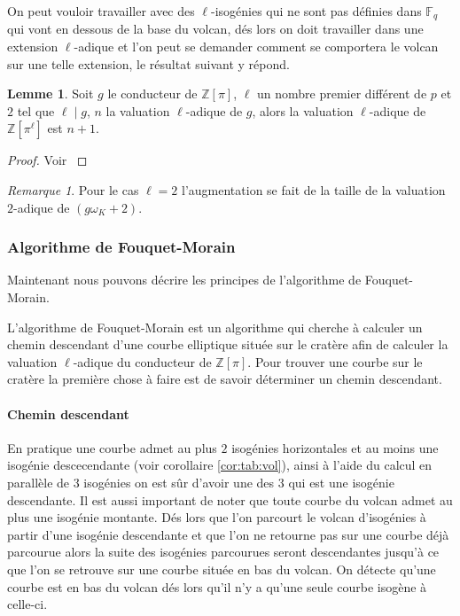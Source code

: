 \documentclass[10pt,a4paper]{book}
\theoremstyle{plain}
\theoremstyle{definition}
\newtheorem{lem}[thm]{Lemme}
\theoremstyle{definition}
\theoremstyle{definition}
\theoremstyle{definition}
\theoremstyle{remark}
\newtheorem{rem}[thm]{Remarque}
\theoremstyle{remark}
\begin{document}
On peut vouloir travailler avec des $\ell$-isogénies qui ne sont pas définies dans $\mathbb{F}_q$ qui vont en dessous de la base du volcan, dés lors on doit travailler dans une extension $\ell$-adique et l'on peut se demander comment se comportera le volcan sur une telle extension, le résultat suivant y répond.

\begin{lem}
Soit $g$ le conducteur de $\mathbb{Z}[\pi]$, $\ell$ un nombre premier différent de $p$ et $2$ tel que $\ell \mid g$, $n$ la valuation $\ell$-adique de $g$, alors la valuation $\ell$-adique de $\mathbb{Z}[\pi^{\ell}]$ est $n+1$. 
\end{lem}

\begin{proof}
Voir \cite[Lemme 6.5.2]{Fouquet01}
\end{proof}

\begin{rem}
Pour le cas $\ell=2$ l'augmentation se fait de la taille de la valuation $2$-adique de $\left( g \omega_K + 2 \right)$.
\end{rem}

\subsubsection{Algorithme de Fouquet-Morain}

Maintenant nous pouvons décrire les principes de l'algorithme de Fouquet-Morain.

L'algorithme de Fouquet-Morain \cite{FouquetMorain02} est un algorithme qui cherche à calculer un chemin descendant d'une courbe elliptique située sur le cratère afin de calculer la valuation $\ell$-adique du conducteur de $\mathbb{Z}[\pi]$. Pour trouver une courbe sur le cratère la première chose à faire est de savoir déterminer un chemin descendant. 

\paragraph{Chemin descendant}
En pratique une courbe admet au plus $2$ isogénies horizontales et au moins une isogénie descecendante (voir corollaire \ref{cor:tab:vol}), ainsi à l'aide du calcul en parallèle de 3 isogénies on est sûr d'avoir une des 3 qui est une isogénie descendante. Il est aussi important de noter que toute courbe du volcan admet au plus une isogénie montante. Dés lors que l'on parcourt le volcan d'isogénies à partir d'une isogénie descendante et que l'on ne retourne pas sur une courbe déjà parcourue alors la suite des isogénies parcourues seront descendantes jusqu'à ce que l'on se retrouve sur une courbe située en bas du volcan. On détecte qu'une courbe est en bas du volcan dés lors qu'il n'y a qu'une seule courbe isogène à celle-ci.
\end{document}

